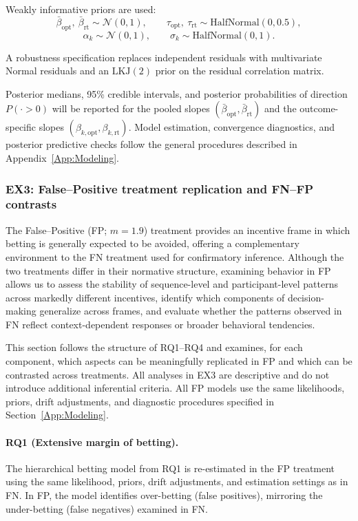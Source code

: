 \documentclass[11pt,a4paper]{article}
\numberwithin{equation}{section}
\begin{document}
Weakly informative priors are used:
\[
\bar{\beta}_{\mathrm{opt}},\ \bar{\beta}_{\mathrm{rt}} \sim \mathcal{N}(0,1),\qquad
\tau_{\mathrm{opt}},\ \tau_{\mathrm{rt}} \sim \mathrm{HalfNormal}(0,0.5),
\]
\[
\alpha_k \sim \mathcal{N}(0,1),\qquad
\sigma_k \sim \mathrm{HalfNormal}(0,1).
\]

A robustness specification replaces independent residuals with multivariate Normal residuals 
and an \(\mathrm{LKJ}(2)\) prior on the residual correlation matrix.

Posterior medians, 95\% credible intervals, and posterior probabilities of direction 
\(P(\cdot > 0)\) will be reported for the pooled slopes 
\((\bar{\beta}_{\mathrm{opt}}, \bar{\beta}_{\mathrm{rt}})\) and the outcome-specific slopes 
\((\beta_{k,\mathrm{opt}}, \beta_{k,\mathrm{rt}})\).  
Model estimation, convergence diagnostics, and posterior predictive checks follow the general 
procedures described in Appendix~\ref{App:Modeling}.

\subsubsection{EX3: False--Positive treatment replication and FN--FP contrasts}
\label{Sec:Ex3}
The False--Positive (FP; $m = 1.9$) treatment provides an incentive frame in which 
betting is generally expected to be avoided, offering a complementary environment 
to the FN treatment used for confirmatory inference.  
Although the two treatments differ in their normative structure, examining 
behavior in FP allows us to assess the stability of sequence-level and 
participant-level patterns across markedly different incentives, identify which 
components of decision-making generalize across frames, and evaluate whether the 
patterns observed in FN reflect context-dependent responses or broader behavioral 
tendencies.  

This section follows the structure of RQ1--RQ4 and examines, for each component, 
which aspects can be meaningfully replicated in FP and which can be contrasted 
across treatments.  
All analyses in EX3 are descriptive and do not introduce additional inferential 
criteria.  
All FP models use the same likelihoods, priors, drift adjustments, and diagnostic 
procedures specified in Section~\ref{App:Modeling}.

\paragraph{RQ1 (Extensive margin of betting).}
The hierarchical betting model from RQ1 is re-estimated in the FP treatment using 
the same likelihood, priors, drift adjustments, and estimation settings as in FN.  
In FP, the model identifies over-betting (false positives), mirroring the 
under-betting (false negatives) examined in FN.
\end{document}
